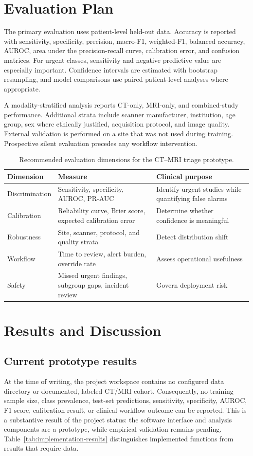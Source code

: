 \documentclass[10pt,a4paper]{article}
\begin{document}
\section{Evaluation Plan}
The primary evaluation uses patient-level held-out data. Accuracy is reported with sensitivity, specificity, precision, macro-F1, weighted-F1, balanced accuracy, AUROC, area under the precision-recall curve, calibration error, and confusion matrices. For urgent classes, sensitivity and negative predictive value are especially important. Confidence intervals are estimated with bootstrap resampling, and model comparisons use paired patient-level analyses where appropriate.

A modality-stratified analysis reports CT-only, MRI-only, and combined-study performance. Additional strata include scanner manufacturer, institution, age group, sex where ethically justified, acquisition protocol, and image quality. External validation is performed on a site that was not used during training. Prospective silent evaluation precedes any workflow intervention.

\begin{table}[t]
\centering
\caption{Recommended evaluation dimensions for the CT--MRI triage prototype.}
\begin{tabular}{p{}p{}p{}}
\toprule
Dimension & Measure & Clinical purpose \\
\midrule
Discrimination & Sensitivity, specificity, AUROC, PR-AUC & Identify urgent studies while quantifying false alarms \\
Calibration & Reliability curve, Brier score, expected calibration error & Determine whether confidence is meaningful \\
Robustness & Site, scanner, protocol, and quality strata & Detect distribution shift \\
Workflow & Time to review, alert burden, override rate & Assess operational usefulness \\
Safety & Missed urgent findings, subgroup gaps, incident review & Govern deployment risk \\
\bottomrule
\end{tabular}
\end{table}

\section{Results and Discussion}
\subsection{Current prototype results}
At the time of writing, the project workspace contains no configured data directory or documented, labeled CT/MRI cohort. Consequently, no training sample size, class prevalence, test-set predictions, sensitivity, specificity, AUROC, F1-score, calibration result, or clinical workflow outcome can be reported. This is a substantive result of the project status: the software interface and analysis components are a prototype, while empirical validation remains pending. Table~\ref{tab:implementation-results} distinguishes implemented functions from results that require data.
\end{document}
